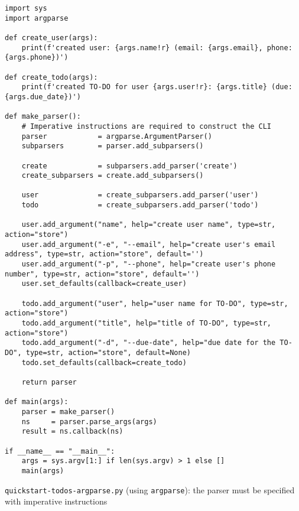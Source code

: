 \documentclass[10pt]{amsart}
\numberwithin{equation}{section}
\begin{document}
\begin{listing}[htbp]
\begin{verbatim}
import sys
import argparse

def create_user(args):
    print(f'created user: {args.name!r} (email: {args.email}, phone: {args.phone})')

def create_todo(args):
    print(f'created TO-DO for user {args.user!r}: {args.title} (due: {args.due_date})')

def make_parser():
    # Imperative instructions are required to construct the CLI 
    parser            = argparse.ArgumentParser()
    subparsers        = parser.add_subparsers()

    create            = subparsers.add_parser('create')
    create_subparsers = create.add_subparsers()

    user              = create_subparsers.add_parser('user')
    todo              = create_subparsers.add_parser('todo')

    user.add_argument("name", help="create user name", type=str, action="store")
    user.add_argument("-e", "--email", help="create user's email address", type=str, action="store", default='')
    user.add_argument("-p", "--phone", help="create user's phone number", type=str, action="store", default='')
    user.set_defaults(callback=create_user)

    todo.add_argument("user", help="user name for TO-DO", type=str, action="store")
    todo.add_argument("title", help="title of TO-DO", type=str, action="store")
    todo.add_argument("-d", "--due-date", help="due date for the TO-DO", type=str, action="store", default=None)
    todo.set_defaults(callback=create_todo)

    return parser

def main(args):
    parser = make_parser()
    ns     = parser.parse_args(args)
    result = ns.callback(ns)

if __name__ == "__main__":
    args = sys.argv[1:] if len(sys.argv) > 1 else []
    main(args)
\end{verbatim}
\caption{\label{orge76d2de}\texttt{quickstart-todos-argparse.py} (using \texttt{argparse}): the parser must be specified with imperative instructions}
\end{listing}
\end{document}
